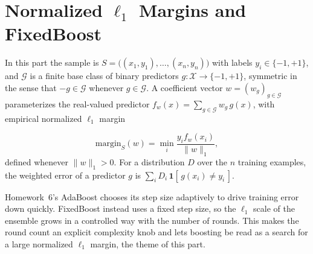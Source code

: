\documentclass[11pt]{article}
\begin{document}
\section{Normalized $\ell_1$ Margins and FixedBoost}
In this part the sample is $S = \bigl((x_1,y_1),\ldots,(x_n,y_n)\bigr)$ with labels $y_i \in \{-1,+1\}$, and $\mathcal{G}$ is a finite base class of binary 
predictors $g : \mathcal{X} \to \{-1,+1\}$, symmetric in the sense that 
$-g \in \mathcal{G}$ whenever $g \in \mathcal{G}$. A coefficient vector $w = (w_g)_{g \in \mathcal{G}}$ parameterizes the real-valued 
predictor $f_w(x) = \sum_{g \in \mathcal{G}} w_g\, g(x)$, with empirical normalized $\ell_1$ margin

\[
\mathrm{margin}_S(w)
=
\min_i \frac{y_i f_w(x_i)}{\|w\|_1},
\]
defined whenever $ \|w\|_1 > 0$.
For a distribution $D$ over the $n$ training examples, the weighted error of a predictor 
$g$ is $\sum_i D_i\, \mathbf{1}[\, g(x_i) \ne y_i \,]$.

Homework~6's AdaBoost chooses its step size adaptively to drive training error down 
quickly. FixedBoost instead uses a fixed step size, so the $\ell_1$ scale of the ensemble 
grows in a controlled way with the number of rounds. This makes the round count an explicit 
complexity knob and lets boosting be read as a search for a large normalized $\ell_1$ margin, 
the theme of this part.
\end{document}
